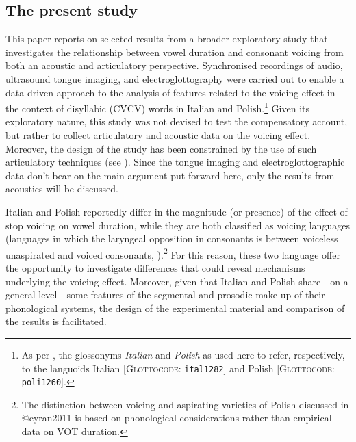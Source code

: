 \documentclass[12pt,]{article}
\let\rmarkdownfootnote\footnote%
\def\footnote{\protect\rmarkdownfootnote}
\begin{document}
\hypertarget{the-present-study}{%
\subsection{The present study}\label{the-present-study}}

This paper reports on selected results from a broader exploratory study
that investigates the relationship between vowel duration and consonant
voicing from both an acoustic and articulatory perspective. Synchronised
recordings of audio, ultrasound tongue imaging, and electroglottography
were carried out to enable a data-driven approach to the analysis of
features related to the voicing effect in the context of disyllabic
(CV́CV) words in Italian and
Polish.\footnote{As per \citet{cysouw2013}, the glossonyms \textit{Italian} and \textit{Polish} as used here to refer, respectively, to the languoids Italian [\textsc{Glottocode}: \texttt{ital1282}] and Polish [\textsc{Glottocode}: \texttt{poli1260}].}
Given its exploratory nature, this study was not devised to test the
compensatory account, but rather to collect articulatory and acoustic
data on the voicing effect. Moreover, the design of the study has been
constrained by the use of such articulatory techniques (see
). Since the tongue imaging and electroglottographic data
don't bear on the main argument put forward here, only the results from
acoustics will be discussed.

Italian and Polish reportedly differ in the magnitude (or presence) of
the effect of stop voicing on vowel duration, while they are both
classified as voicing languages (languages in which the laryngeal
opposition in consonants is between voiceless unaspirated and voiced
consonants,
\citealt{beckman2013}).\footnote{The distinction between voicing and aspirating varieties of Polish discussed in @cyran2011 is based on phonological considerations rather than empirical data on VOT duration.
} For this reason, these two language offer the opportunity to
investigate differences that could reveal mechanisms underlying the
voicing effect. Moreover, given that Italian and Polish share---on a
general level---some features of the segmental and prosodic make-up of
their phonological systems, the design of the experimental material and
comparison of the results is facilitated.
\end{document}
